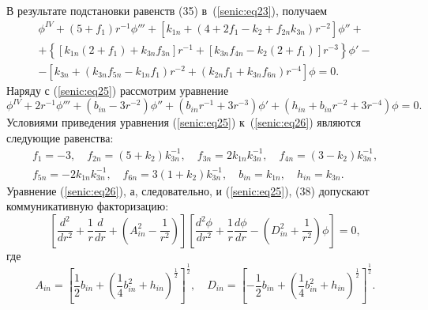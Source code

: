 В результате подстановки равенств (35) в~(\ref{senic:eq23}), получаем 
\begin{multline}
\phi ^{IV} + \left( {5 + f_1 } \right)r^{ - 1}{\phi }''' + \left[ {k_{1n} + 
\left( {4 + 2f_1 - k_2 + f_{2n} k_{3n} } \right)r^{ - 2}} \right]{\phi }'' + 
\\ 
 + \left\{ {\left[ {k_{1n} \left( {2 + f_1 } \right) + k_{3n} f_{3n} } 
\right]r^{ - 1} + \left[ {k_{3n} f_{4n} - k_2 \left( {2 + f_1 } \right)} 
\right]r^{ - 3}} \right\}{\phi }' - \\
\label{senic:eq25}
 - \left[ {k_{3n} + \left( {k_{3n} f_{5n} - k_{1n} f_1 } \right)r^{ - 2} + 
\left( {k_{2n} f_1 + k_{3n} f_{6n} } \right)r^{ - 4}} \right]\phi = 0.
\end{multline}
Наряду с (\ref{senic:eq25}) рассмотрим уравнение
\begin{equation}
\label{senic:eq26}
\phi ^{IV} + 2r^{ - 1}{\phi }''' + \left( {b_{in} - 3r^{ - 2}} \right){\phi 
}'' + \left( {b_{in} r^{ - 1} + 3r^{ - 3}} \right){\phi }' + \left( {h_{in} 
+ b_{in} r^{ - 2} + 3r^{ - 4}} \right)\phi = 0.
\end{equation}
Условиями приведения уравнения (\ref{senic:eq25}) к~(\ref{senic:eq26}) являются следующие равенства:
\begin{equation}
\begin{array}{c} 
f_1 = - 3,\quad 
f_{2n} = \left( {5 + k_2 } \right)k_{3n}^{ - 1},\quad 
f_{3n} = 2k_{1n} k_{3n}^{ - 1},\quad 
f_{4n} = \left( {3 - k_2 } \right)k_{3n}^{ - 1}, \\
f_{5n} = - 2k_{1n} k_{3n}^{ - 1},\quad
f_{6n} = 3\left( {1 + k_2 } \right)k_{3n}^{ - 1},\quad
b_{in} = k_{1n},\quad h_{in} = k_{3n} .
\end{array}
\end{equation}
Уравнение (\ref{senic:eq26}), а, следовательно, и (\ref{senic:eq25}), (38) допускают коммуникативную факторизацию:
\begin{equation}
\label{senic:eq27}
\left[ {\frac{d^2}{dr^2} + \frac{1}{r}\frac{d}{dr} + \left( {A_{in}^2 - 
\frac{1}{r^2}} \right)} \right]\left[ {\frac{d^2\phi }{dr^2} + 
\frac{1}{r}\frac{d\phi }{dr} - \left( {D_{in}^2 + \frac{1}{r^2}} \right)\phi 
} \right] = 0,
\end{equation}
где 
\begin{equation}
\label{senic:eq28}
A{ }_{in} = \left[ {\frac12b_{in} + \left( {\frac14b_{in}^2 + h_{in} } 
\right)^{\frac{1}{2}}} \right]^{\frac{1}{2}},\quad 
D_{in} = \left[ { - \frac12b_{in} + 
\left( {\frac14b_{in}^2 + h_{in} } \right)^{\frac{1}{2}}} 
\right]^{\frac{1}{2}}.
\end{equation}

